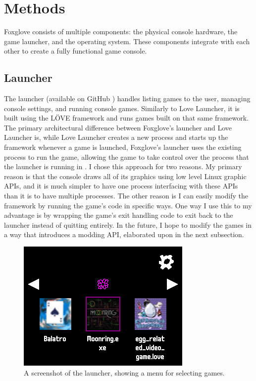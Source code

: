\documentclass[10pt,twocolumn]{article}
\begin{document}
\section{Methods}

Foxglove consists of multiple components:
the physical console hardware, the
game launcher, and the operating system. These components integrate with each
other to create a fully functional game console.

\subsection{Launcher}

The launcher (available on GitHub
\cite{perry_lavenderperryfoxglove-launcher_2025})
handles listing games to the user, managing console settings, and
running console games. Similarly to Love Launcher,
it is built using the LÖVE
framework and runs games built on that same framework. The primary architectural
difference between Foxglove's launcher and
Love Launcher is, while Love Launcher
creates a new process and starts up the framework whenever a game is launched,
Foxglove's launcher uses the existing process to run the game,
allowing the game
to take control over the process that the launcher is running in
\cite{noauthor_glitchapplovelauncher_nodate}. I chose this approach for two
reasons. My primary reason is that the console draws all of its graphics using
low level Linux graphic APIs, and it is much simpler to have one process
interfacing with these APIs than it is to have multiple processes. The other
reason is I can easily modify the framework by running the game's code in
specific ways. One way I use this to my advantage is by wrapping the game's exit
handling code to exit back to the launcher instead of quitting entirely. In the
future, I hope to modify the games in a way that introduces a modding API,
elaborated upon in the next subsection.

\begin{figure}[!htb]
    \centering
    \includegraphics[width=.95\linewidth]{launcher.png}
    \caption{
        A screenshot of the launcher, showing a menu for selecting games.
    }
\end{figure}
\end{document}
